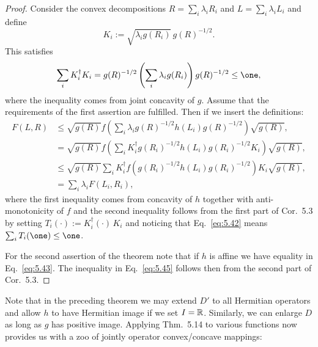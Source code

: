\documentclass[11pt,a4paper]{article}
\theoremstyle{plain}
\theoremstyle{definition}
\theoremstyle{remark}
\numberwithin{equation}{section}
\begin{document}
\begin{proof}
    Consider the convex decompositions $R=\sum_i \lambda_i R_i$ and $L=\sum_i \lambda_i L_i$
    and define
    \[
        K_i := \sqrt{\lambda_i g(R_i)}\, g(R)^{-1/2}.
    \]
    This satisfies
    \begin{equation}\label{eq:5.42}
        \sum_i K_i^\dagger K_i
        = g(R)^{-1/2}\left(\sum_i \lambda_i g(R_i)\right) g(R)^{-1/2}
        \le \one,
    \end{equation}
    where the inequality comes from joint concavity of $g$. Assume that the requirements
    of the first assertion are fulfilled. Then if we insert the definitions:
    \begin{align}
        F(L,R)
         &\le \sqrt{g(R)}
        f\!\left(\sum_i \lambda_i g(R)^{-1/2} h(L_i) g(R)^{-1/2}\right)
        \sqrt{g(R)}, \label{eq:5.43}\\
         &= \sqrt{g(R)}
        f\!\left(\sum_i K_i^\dagger g(R_i)^{-1/2} h(L_i) g(R_i)^{-1/2} K_i\right)
        \sqrt{g(R)}, \label{eq:5.44}\\
         &\le \sqrt{g(R)}
        \sum_i K_i^\dagger
        f\!\left(g(R_i)^{-1/2} h(L_i) g(R_i)^{-1/2}\right)
        K_i
        \sqrt{g(R)}, \label{eq:5.45}\\
         &= \sum_i \lambda_i F(L_i,R_i), \label{eq:5.46}
    \end{align}
    where the first inequality comes from concavity of $h$ together with
    anti-monotonicity of $f$ and the second inequality follows from the first part of
    Cor.~5.3 by setting $T_i(\cdot):=K_i^\dagger (\cdot)\,K_i$ and noticing that
    Eq.~\eqref{eq:5.42} means $\sum_i T_i(\one)\le \one$.

    For the second assertion of the theorem note that if $h$ is affine we have equality in
    Eq.~\eqref{eq:5.43}. The inequality in Eq.~\eqref{eq:5.45} follows then from the
    second part of Cor.~5.3.
\end{proof}

Note that in the preceding theorem we may extend $D'$ to all Hermitian operators and
allow $h$ to have Hermitian image if we set $I=\mathbb{R}$. Similarly, we can enlarge $D$ as
long as $g$ has positive image. Applying Thm.~5.14 to various functions now provides
us with a zoo of jointly operator convex/concave mappings:
\end{document}
